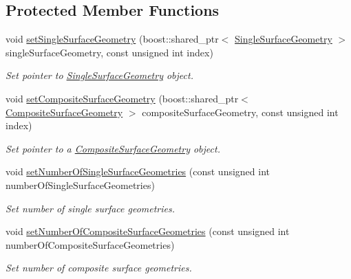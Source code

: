 \subsection*{Protected Member Functions}
\begin{DoxyCompactItemize}
\item 
void \hyperlink{classtudat_1_1geometric__shapes_1_1CompositeSurfaceGeometry_a0144ca0331c6931d66d1a3d7b8504cf6}{set\+Single\+Surface\+Geometry} (boost\+::shared\+\_\+ptr$<$ \hyperlink{classtudat_1_1geometric__shapes_1_1SingleSurfaceGeometry}{Single\+Surface\+Geometry} $>$ single\+Surface\+Geometry, const unsigned int index)
\begin{DoxyCompactList}\small\item\em Set pointer to \hyperlink{classtudat_1_1geometric__shapes_1_1SingleSurfaceGeometry}{Single\+Surface\+Geometry} object. \end{DoxyCompactList}\item 
void \hyperlink{classtudat_1_1geometric__shapes_1_1CompositeSurfaceGeometry_a8ee10753a669afed204315933d3c6972}{set\+Composite\+Surface\+Geometry} (boost\+::shared\+\_\+ptr$<$ \hyperlink{classtudat_1_1geometric__shapes_1_1CompositeSurfaceGeometry}{Composite\+Surface\+Geometry} $>$ composite\+Surface\+Geometry, const unsigned int index)
\begin{DoxyCompactList}\small\item\em Set pointer to a \hyperlink{classtudat_1_1geometric__shapes_1_1CompositeSurfaceGeometry}{Composite\+Surface\+Geometry} object. \end{DoxyCompactList}\item 
void \hyperlink{classtudat_1_1geometric__shapes_1_1CompositeSurfaceGeometry_afd48747cbffb44c8d43c0bf9f7fa9f8e}{set\+Number\+Of\+Single\+Surface\+Geometries} (const unsigned int number\+Of\+Single\+Surface\+Geometries)
\begin{DoxyCompactList}\small\item\em Set number of single surface geometries. \end{DoxyCompactList}\item 
void \hyperlink{classtudat_1_1geometric__shapes_1_1CompositeSurfaceGeometry_ac3cdda9771a521bb06221f192437d4cd}{set\+Number\+Of\+Composite\+Surface\+Geometries} (const unsigned int number\+Of\+Composite\+Surface\+Geometries)
\begin{DoxyCompactList}\small\item\em Set number of composite surface geometries. \end{DoxyCompactList}\end{DoxyCompactItemize}
